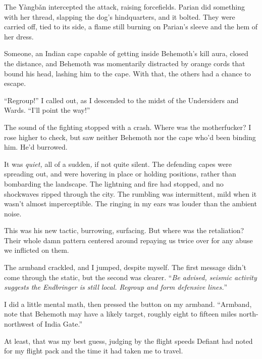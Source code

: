 The Y\`{a}ngb\v{a}n intercepted the attack, raising forcefields.  Parian did something with her thread, slapping the dog's hindquarters, and it bolted.  They were carried off, tied to its side, a flame still burning on Parian's sleeve and the hem of her dress.



Someone, an Indian cape capable of getting inside Behemoth's kill aura, closed the distance, and Behemoth was momentarily distracted by orange cords that bound his head, lashing him to the cape.  With that, the others had a chance to escape.



``Regroup!'' I called out, as I descended to the midst of the Undersiders and Wards.  ``I'll point the way!''



The sound of the fighting stopped with a crash.  Where was the motherfucker?  I rose higher to check, but saw neither Behemoth nor the cape who'd been binding him.  He'd burrowed.



It was \emph{quiet,} all of a sudden\emph{, }if not quite silent.  The defending capes were spreading out, and were hovering in place or holding positions, rather than bombarding the landscape.  The lightning and fire had stopped, and no shockwaves ripped through the city.  The rumbling was intermittent, mild when it wasn't almost imperceptible.  The ringing in my ears was louder than the ambient noise.



This was his new tactic, burrowing, surfacing.  But where was the retaliation?  Their whole damn pattern centered around repaying us twice over for any abuse we inflicted on them.



The armband crackled, and I jumped, despite myself.  The first message didn't come through the static, but the second was clearer.  ``\emph{Be advised, seismic activity suggests the Endbringer is still local.  Regroup and form defensive lines.}''



I did a little mental math, then pressed the button on my armband.  ``Armband, note that Behemoth may have a likely target, roughly eight to fifteen miles north-northwest of India Gate.''



At least, that was my best guess, judging by the flight speeds Defiant had noted for my flight pack and the time it had taken me to travel.



